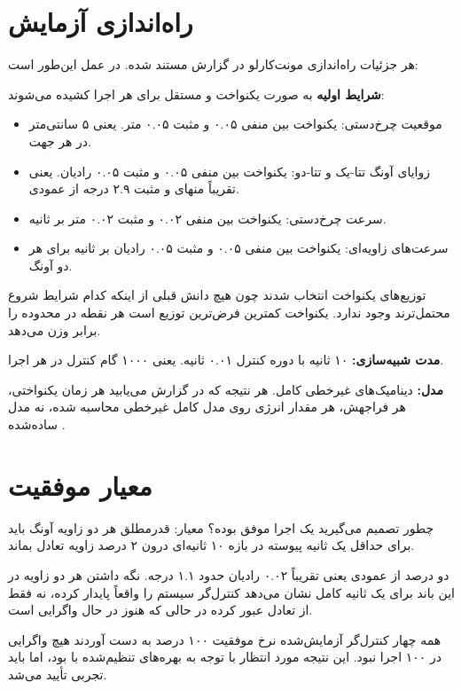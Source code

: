 \documentclass[12pt, a4paper]{article}
\newcommand{\dash}{\lr{---}}
\begin{document}
\section{راه‌اندازی آزمايش}

هر جزئيات راه‌اندازی مونت‌کارلو در گزارش مستند شده. در عمل اين‌طور است:

\textbf{شرايط اوليه} به صورت يکنواخت و مستقل برای هر اجرا کشيده می‌شوند:

\begin{itemize}
  \item موقعيت چرخ‌دستی: يکنواخت بين منفی ۰.۰۵ و مثبت ۰.۰۵ متر. يعنی ۵ سانتی‌متر در هر جهت.
  \item زوايای آونگ تتا-يک و تتا-دو: يکنواخت بين منفی ۰.۰۵ و مثبت ۰.۰۵ رادیان. يعنی تقريباً منهای و مثبت ۲.۹ درجه از عمودی.
  \item سرعت چرخ‌دستی: يکنواخت بين منفی ۰.۰۲ و مثبت ۰.۰۲ متر بر ثانيه.
  \item سرعت‌های زاويه‌ای: يکنواخت بين منفی ۰.۰۵ و مثبت ۰.۰۵ رادیان بر ثانيه برای هر دو آونگ.
\end{itemize}

توزيع‌های يکنواخت انتخاب شدند چون هيچ دانش قبلی از اينکه کدام شرايط شروع محتمل‌ترند وجود ندارد. يکنواخت کمترين فرض‌ترين توزيع است \dash{} هر نقطه در محدوده را برابر وزن می‌دهد.

\textbf{مدت شبيه‌سازی:} ۱۰ ثانيه با دوره کنترل ۰.۰۱ ثانيه. يعنی ۱۰۰۰ گام کنترل در هر اجرا.

\textbf{مدل:} ديناميک‌های غيرخطی کامل. هر نتيجه  که در گزارش می‌يابيد \dash{} هر زمان يکنواختی، هر فراجهش، هر مقدار انرژی \dash{} روی مدل کامل غيرخطی محاسبه شده، نه مدل ساده‌شده .

\section{معيار موفقيت}

چطور تصميم می‌گيريد يک اجرا موفق بوده؟ معيار: قدرمطلق هر دو زاويه آونگ بايد برای حداقل يک ثانيه پيوسته در بازه ۱۰ ثانيه‌ای درون ۲ درصد زاويه تعادل بماند.

دو درصد از عمودی يعنی تقريباً ۰.۰۲ رادیان \dash{} حدود ۱.۱ درجه. نگه داشتن هر دو زاويه در اين باند برای يک ثانيه کامل نشان می‌دهد کنترل‌گر سيستم را واقعاً پايدار کرده، نه فقط از تعادل عبور کرده در حالی که هنوز در حال واگرايی است.

همه چهار کنترل‌گر آزمايش‌شده نرخ موفقيت ۱۰۰ درصد به دست آوردند \dash{} هيچ واگرايی در ۱۰۰ اجرا نبود. اين نتيجه مورد انتظار با توجه به بهره‌های تنظيم‌شده با  بود، اما بايد تجربی تأييد می‌شد.
\end{document}
